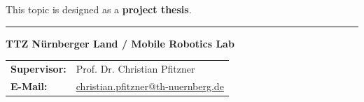 \documentclass{ohm_project_description}
\begin{document}
\vspace{0.5cm}
This topic is designed as a \textbf{project thesis}.

\vfill
\textcolor{ohm_red}{\rule{\linewidth}{0.4mm}}
\textbf{\textcolor{ohm_red}{TTZ Nürnberger Land / Mobile Robotics Lab}} \\
\begin{tabular}{@{}ll}
\textbf{Supervisor:} & Prof. Dr. Christian Pfitzner \\
\textbf{E-Mail:}     & \href{mailto:christian.pfitzner@th-nuernberg.de}{christian.pfitzner@th-nuernberg.de} \\
\end{tabular}
\end{document}
